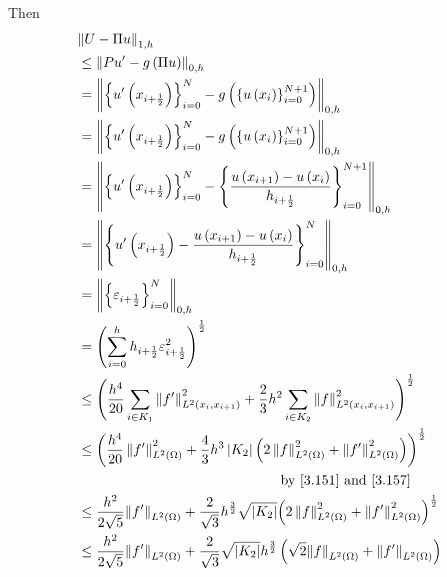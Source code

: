 \documentclass[a4paper]{article}
\numberwithin{equation}{section}
\begin{document}
Then
\begin{align}
&{\left\| {U - \Pi u} \right\|_{1,h}} \\
&\le {\left\| {Pu' - g\left( {\Pi u} \right)} \right\|_{0,h}}\\
 &= {\left\| {\left\{ {u'\left( {{x_{i + \frac{1}{2}}}} \right)} \right\}_{i = 0}^N - g\left( {\left\{ {u\left( {{x_i}} \right)} \right\}_{i = 0}^{N + 1}} \right)} \right\|_{0,h}}\\
 &= {\left\| {\left\{ {u'\left( {{x_{i + \frac{1}{2}}}} \right)} \right\}_{i = 0}^N - g\left( {\left\{ {u\left( {{x_i}} \right)} \right\}_{i = 0}^{N + 1}} \right)} \right\|_{0,h}}\\
 &= {\left\| {\left\{ {u'\left( {{x_{i + \frac{1}{2}}}} \right)} \right\}_{i = 0}^N - \left\{ {\frac{{u\left( {{x_{i + 1}}} \right) - u\left( {{x_i}} \right)}}{{{h_{i + \frac{1}{2}}}}}} \right\}_{i = 0}^{N + 1}} \right\|_{0,h}}\\
 &= {\left\| {\left\{ {u'\left( {{x_{i + \frac{1}{2}}}} \right) - \frac{{u\left( {{x_{i + 1}}} \right) - u\left( {{x_i}} \right)}}{{{h_{i + \frac{1}{2}}}}}} \right\}_{i = 0}^N} \right\|_{0,h}}\\
& = {\left\| {\left\{ {{\varepsilon _{i + \frac{1}{2}}}} \right\}_{i = 0}^N} \right\|_{0,h}}\\
& = {\left( {\sum\limits_{i = 0}^h {{h_{i + \frac{1}{2}}}\varepsilon _{i + \frac{1}{2}}^2} } \right)^{\frac{1}{2}}}\\
& \le {\left( {\frac{{{h^4}}}{{20}}\sum\limits_{i \in {K_1}} {\left\| {f'} \right\|_{{L^2}\left( {{x_i},{x_{i + 1}}} \right)}^2}  + \frac{2}{3}{h^2}\sum\limits_{i \in {K_2}} {\left\| f \right\|_{{L^2}\left( {{x_i},{x_{i + 1}}} \right)}^2} } \right)^{\frac{1}{2}}}\\
& \le {\left( {\frac{{{h^4}}}{{20}}\left\| {f'} \right\|_{{L^2}\left( \Omega  \right)}^2 + \frac{4}{3}{h^3}\left| {{K_2}} \right|\left( {2\left\| f \right\|_{{L^2}\left( \Omega  \right)}^2 + \left\| {f'} \right\|_{{L^2}\left( \Omega  \right)}^2} \right)} \right)^{\frac{1}{2}}}\\
&\hspace{5cm}\mbox{ by \eqref{3.151} and \eqref{3.157}}\\
& \le \frac{{{h^2}}}{{2\sqrt 5 }}{\left\| {f'} \right\|_{{L^2}\left( \Omega  \right)}} + \frac{2}{{\sqrt 3 }}{h^{\frac{3}{2}}}\sqrt {\left| {{K_2}} \right|} {\left( {2\left\| f \right\|_{{L^2}\left( \Omega  \right)}^2 + \left\| {f'} \right\|_{{L^2}\left( \Omega  \right)}^2} \right)^{\frac{1}{2}}}\label{3.169}\\
& \le \frac{{{h^2}}}{{2\sqrt 5 }}{\left\| {f'} \right\|_{{L^2}\left( \Omega  \right)}} + \frac{2}{{\sqrt 3 }}\sqrt {\left| {{K_2}} \right|} {h^{\frac{3}{2}}}\left( {\sqrt 2 {{\left\| f \right\|}_{{L^2}\left( \Omega  \right)}} + {{\left\| {f'} \right\|}_{{L^2}\left( \Omega  \right)}}} \right) \label{3.170}
\end{align}
\end{document}
